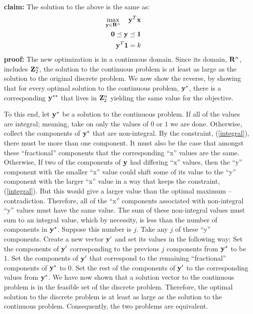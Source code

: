 \documentclass[12pt]{article}
\begin{document}
{\bf claim:} The solution to the above is the same as: 
\begin{eqnarray}
\mathop{\rm max}_{{\bf y} \in {\bf R}^n}\limits \quad {\bf y}^T {\bf x} &&  \\
{\bf 0} \preceq {\bf y}   \preceq  {\bf 1}&& \\ 
{\bf y}^T {\bf 1}  =  k && \label{integral} 
\end{eqnarray}
{\bf proof:}
The new optimization is in a continuous domain. Since its domain, ${\bf R}^n$, 
includes ${\bf Z}_2^n$, the solution to the continuous problem is at least as 
large as the solution to the original discrete problem.
We now show the reverse, by showing that for every optimal solution to the continuous
problem, ${\bf y}^*$, there is a corresponding ${\bf y}^{**}$ that lives
in ${\bf Z}_2^n$ yielding the same value for the objective.

To this end, let ${\bf y}^*$ be a solution to the continuous problem. If all
of the values are integral; meaning, take on only the values of $0$ or $1$ we are done.
Otherwise, collect the components of ${\bf y}^*$ that are non-integral. By 
the constraint, (\ref{integral}), there must be more than one component. 
It must also be the case that amongst these ``fractional'' components that
the corresponding ``x'' values are the same. Otherwise, If two of the components of ${\bf y}$
had differing ``x'' values, then the ``y'' component with the smaller ``x'' value could
shift some of its value to the ``y'' component with the larger ``x'' value in 
a way that keeps the constraint, (\ref{integral}). But this would give a larger 
value than the optimal maximum -- contradiction. Therefore, all of the 
``x'' components associated with non-integral ``y'' values must have the same 
value. The sum of these non-integral values must sum to an integral value, which 
by necessity, is less than the number of components in ${\bf y}^*$. Suppose this number is
$j$. Take any $j$ of these ``y'' components. Create a new vector ${\bf y}^\prime$
and set its values in the following way: Set the components of ${\bf y}^\prime$
corresponding to the previous $j$ components from ${\bf y}^*$ to be $1$. Set the components
of ${\bf y}^\prime$ that correspond to the remaining ``fractional'' components of 
${\bf y}^*$ to $0$. Set the rest of the components of ${\bf y}^\prime$ to the 
corresponding values from ${\bf y}^*$. We have now shown that a solution vector to the 
continuous problem is in the feasible set of the discrete problem. Therefore, the
optimal solution to the discrete problem is at least as large as the solution to the 
continuous problem. Consequently, the two problems are equivalent.
\end{document}
